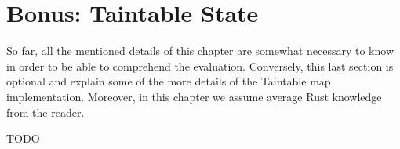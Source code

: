\section{Bonus: Taintable State}

So far, all the mentioned details of this chapter are somewhat necessary to know in order to be able
to comprehend the evaluation. Conversely, this last section is optional and explain some of the more
details of the Taintable map implementation. Moreover, in this chapter we assume average Rust
knowledge from the reader.

TODO
